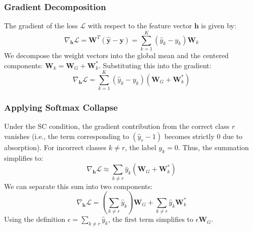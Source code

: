 \documentclass{article}
\theoremstyle{plain}
\theoremstyle{definition}
\theoremstyle{remark}
\begin{document}
\subsubsection{Gradient Decomposition}
The gradient of the loss $\mathcal{L}$ with respect to the feature vector $\bm{h}$ is given by:
\begin{equation}
    \nabla_{\bm{h}} \mathcal{L} = \bm{W}^T (\hat{\bm{y}} - \bm{y}) = \sum_{k=1}^K (\hat{y}_k - y_k) \bm{W}_k
\end{equation}
We decompose the weight vectors into the global mean and the centered components: $\bm{W}_k = \bm{W}_G + \bm{W}_k^*$. Substituting this into the gradient:
\begin{equation}
    \nabla_{\bm{h}} \mathcal{L} = \sum_{k=1}^K (\hat{y}_k - y_k) (\bm{W}_G + \bm{W}_k^*)
\end{equation}

\subsubsection{Applying Softmax Collapse}
Under the SC condition, the gradient contribution from the correct class $r$ vanishes (i.e., the term corresponding to $(\hat{y}_r - 1)$ becomes strictly 0 due to absorption). For incorrect classes $k \neq r$, the label $y_k = 0$. Thus, the summation simplifies to:
\begin{equation}
    \nabla_{\bm{h}} \mathcal{L} \approx \sum_{k \neq r} \hat{y}_k (\bm{W}_G + \bm{W}_k^*)
\end{equation}
We can separate this sum into two components:
\begin{equation}
    \nabla_{\bm{h}} \mathcal{L} = \left( \sum_{k \neq r} \hat{y}_k \right) \bm{W}_G + \sum_{k \neq r} \hat{y}_k \bm{W}_k^*
\end{equation}
Using the definition $\epsilon = \sum_{k \neq r} \hat{y}_k$, the first term simplifies to $\epsilon \bm{W}_G$.
\end{document}
